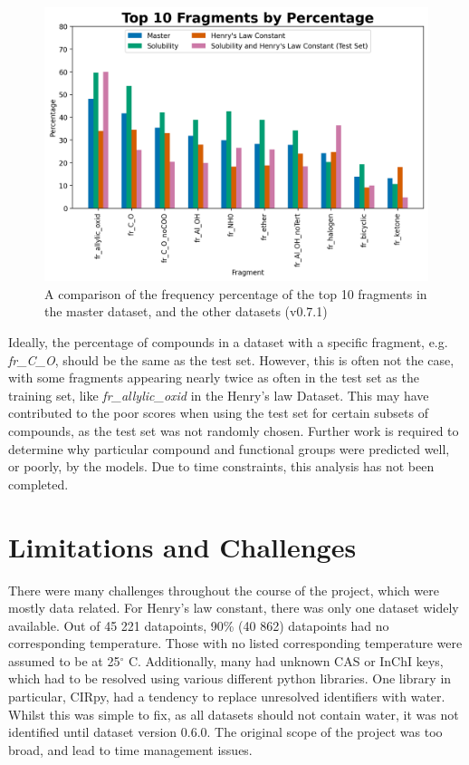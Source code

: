 \documentclass[11pt, titlepage]{article}
\begin{document}
\begin{figure}[H]
	\centering\small
	\includegraphics[width=0.9\linewidth]{figures/FuncGroupAnalysis.png}
	\caption{A comparison of the frequency percentage of the top 10 fragments in the master dataset, and the other datasets (v0.7.1)}
	\label{fig:FuncGroupAnalysis}
\end{figure}

Ideally, the percentage of compounds in a dataset with a specific fragment, e.g. \textit{fr\_C\_O}, should be the same as the test set. However, this is often not the case, with some fragments appearing nearly twice as often in the test set as the training set, like \textit{fr\_allylic\_oxid} in the Henry's law Dataset. This may have contributed to the poor scores when using the test set for certain subsets of compounds, as the test set was not randomly chosen. Further work is required to determine why particular compound and functional groups were predicted well, or poorly, by the models. Due to time constraints, this analysis has not been completed.

\section{Limitations and Challenges}
\label{sec:LimitationsChallenges}
There were many challenges throughout the course of the project, which were mostly data related. For Henry's law constant, there was only one dataset widely available. Out of 45 221 datapoints, 90\% (40 862) datapoints had no corresponding temperature. Those with no listed corresponding temperature were assumed to be at 25$^\circ$ C. Additionally, many had unknown CAS or InChI keys, which had to be resolved using various different python libraries. One library in particular, CIRpy, had a tendency to replace unresolved identifiers with water. Whilst this was simple to fix, as all datasets should not contain water, it was not identified until dataset version 0.6.0. The original scope of the project was too broad, and lead to time management issues. 
\end{document}
